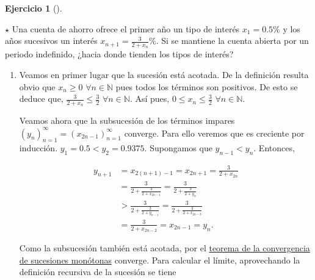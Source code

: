 \documentclass[
  spanish,
  a4paper,
]{scrreport}
\theoremstyle{definition}
\newtheorem{exercise}{Ejercicio}[chapter]
\theoremstyle{remark}
\begin{document}
\begin{exercise}[]\protect\hypertarget{exr-sucesion-intereses}{}\label{exr-sucesion-intereses}

\(\star\) Una cuenta de ahorro ofrece el primer año un tipo de interés
\(x_1=0.5\%\) y los años sucesivos un interés
\(x_{n+1}=\frac{3}{2+x_n}\%\). Si se mantiene la cuenta abierta por un
periodo indefinido, ¿hacia donde tienden los tipos de interés?

\end{exercise}

\begin{tcolorbox}[enhanced jigsaw, arc=.35mm, bottomrule=.15mm, bottomtitle=1mm, breakable, colback=white, colbacktitle=quarto-callout-tip-color!10!white, colframe=quarto-callout-tip-color-frame, coltitle=black, left=2mm, leftrule=.75mm, opacityback=0, opacitybacktitle=0.6, rightrule=.15mm, title=\textcolor{quarto-callout-tip-color}{\faLightbulb}\hspace{0.5em}{Solución}, titlerule=0mm, toprule=.15mm, toptitle=1mm]

\begin{enumerate}
\def\labelenumi{\alph{enumi}.}
\item
  Veamos en primer lugar que la sucesión está acotada. De la definición
  resulta obvio que \(x_n\geq 0\) \(\forall n\in\mathbb{N}\) pues todos
  los términos son positivos. De esto se deduce que,
  \(\frac{3}{2+x_n}\leq \frac{3}{2}\) \(\forall n\in\mathbb{N}\). Así
  pues, \(0\leq x_n\leq \frac{3}{2}\) \(\forall n\in\mathbb{N}\).

  Veamos ahora que la subsucesión de los términos impares
  \((y_n)_{n=1}^\infty = (x_{2n-1})_{n=1}^\infty\) converge. Para ello
  veremos que es creciente por inducción. \(y_1=0.5<y_2=0.9375\).
  Supongamos que \(y_{n-1}<y_n\). Entonces,

  \begin{align*}
   y_{n+1} &= x_{2(n+1)-1} = x_{2n+1} = \frac{3}{2+x_{2n}} \\ 
   &= \frac{3}{2+\frac{3}{2+x_{2n-1}}} = \frac{3}{2+\frac{3}{2+y_n}} \\ 
   &> \frac{3}{2+\frac{3}{2+y_{n-1}}} = \frac{3}{2+\frac{3}{2+x_{2n-3}}} \\
   &= \frac{3}{2+x_{2n-2}} = x_{2n-1} = y_n.
   \end{align*}

  Como la subsucesión también está acotada, por el
  \href{https://aprendeconalf.es/analisis-manual/sucesiones.html\#thm-convergencia-monotona}{teorema
  de la convergencia de sucesiones monótonas} converge. Para calcular el
  límite, aprovechando la definición recursiva de la sucesión se tiene


\end{enumerate}
\end{tcolorbox}
\end{document}
